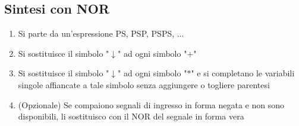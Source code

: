 \documentclass{subfiles}
\begin{document}
\subsection{Sintesi con NOR}

\begin{enumerate}
    \item Si parte da un’espressione PS, PSP, PSPS, $\dots$
    \item Si sostituisce il simbolo "$\downarrow$" ad ogni simbolo "$+$"
    \item Si sostituisce il simbolo "$\downarrow$" ad ogni simbolo "$*$" e si completano le variabili singole affiancate a tale simbolo senza aggiungere o togliere parentesi
    \item (Opzionale) Se compaiono segnali di ingresso in forma negata e non sono disponibili, li sostituisco con il NOR del segnale in forma vera
\end{enumerate}
\end{document}
